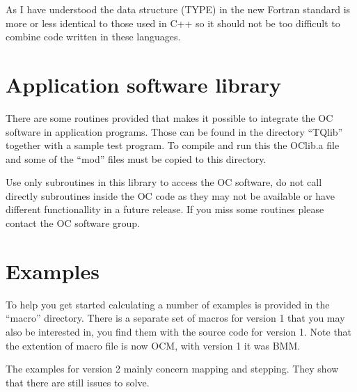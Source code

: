 \documentclass[12pt]{article}
\begin{document}
As I have understood the data structure (TYPE) in the new Fortran
standard is more or less identical to those used in C++ so it should
not be too difficult to combine code written in these languages.

\section{Application software library}

There are some routines provided that makes it possible to integrate
the OC software in application programs.  Those can be found in the
directory ``TQlib'' together with a sample test program.  To compile
and run this the OClib.a file and some of the ``mod'' files must be
copied to this directory.

Use only subroutines in this library to access the OC software, do not
call directly subroutines inside the OC code as they may not be
available or have different functionallity in a future release.  If
you miss some routines please contact the OC software group.

\section{Examples}

To help you get started calculating a number of examples is provided
in the ``macro'' directory.  There is a separate set of macros for
version 1 that you may also be interested in, you find them with the
source code for version 1.  Note that the extention of macro file is
now OCM, with version 1 it was BMM.

The examples for version 2 mainly concern mapping and stepping.  They
show that there are still issues to solve.
\end{document}
